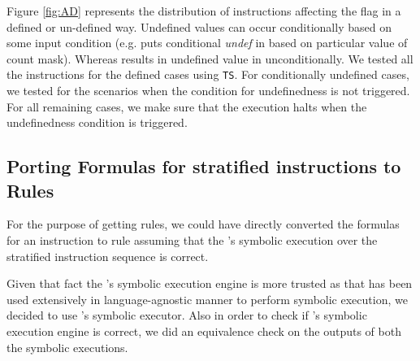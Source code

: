    Figure \ref{fig:AD} represents the distribution of instructions affecting the  flag
   in a defined or un-defined way. Undefined values can occur conditionally based on some input condition (e.g.  puts conditional \emph{undef} in  based on particular value of count mask). Whereas  results in undefined value in  unconditionally. We tested all the instructions for the defined cases using {\tt TS}. For conditionally undefined cases, we tested for the scenarios when the condition for undefinedness is not triggered.  For all remaining cases,  we make sure that the \K execution halts when the undefinedness condition is triggered.        

\subsection{Porting Formulas for stratified instructions to \K Rules}

For the purpose of getting  \K rules, we could have directly converted the
\Strata formulas for an instruction to \K rule assuming that the \Strata's
symbolic execution over the stratified instruction sequence is correct.

Given that fact the \K's symbolic execution engine is more trusted as that has
been used extensively in language-agnostic manner to perform symbolic execution,
     we decided to use \K's symbolic executor. Also in order to check if
     \Strata's symbolic execution engine is correct, we did an equivalence check
     on the outputs of both the symbolic executions.   
 

